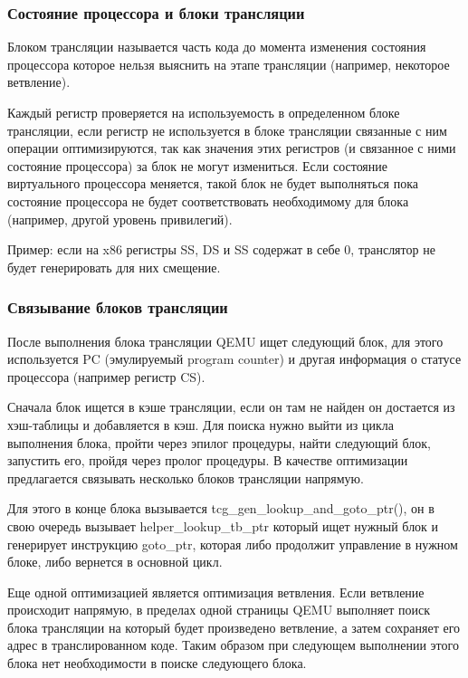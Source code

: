 \subsubsection{Состояние процессора и блоки трансляции}

Блоком трансляции называется часть кода до момента изменения состояния процессора которое нельзя выяснить на этапе трансляции (например, некоторое ветвление).

Каждый регистр проверяется на используемость в определенном блоке трансляции, если регистр не используется в блоке трансляции связанные с ним операции оптимизируются, так как значения этих регистров (и связанное с ними состояние процессора) за блок не могут измениться. Если состояние виртуального процессора меняется, такой блок не будет выполняться пока состояние процессора не будет соответствовать необходимому для блока (например, другой уровень привилегий).

Пример: если на x86 регистры SS, DS и SS содержат в себе 0, транслятор не будет генерировать для них смещение.

\subsubsection{Связывание блоков трансляции}

После выполнения блока трансляции QEMU ищет следующий блок, для этого используется PC (эмулируемый program counter) и другая информация о статусе процессора (например регистр CS).

Сначала блок ищется в кэше трансляции, если он там не найден он достается из хэш-таблицы и добавляется в кэш. Для поиска нужно выйти из цикла выполнения блока, пройти через эпилог процедуры, найти следующий блок, запустить его, пройдя через пролог процедуры. В качестве оптимизации предлагается связывать несколько блоков трансляции напрямую.

Для этого в конце блока вызывается tcg\_gen\_lookup\_and\_goto\_ptr(), он в свою очередь вызывает helper\_lookup\_tb\_ptr который ищет нужный блок и генерирует инструкцию goto\_ptr, которая либо продолжит управление в нужном блоке, либо вернется в основной цикл.

Еще одной оптимизацией является оптимизация ветвления. Если ветвление происходит напрямую, в пределах одной страницы QEMU выполняет поиск блока трансляции на который будет произведено ветвление, а затем сохраняет его адрес в транслированном коде. Таким образом при следующем выполнении этого блока нет необходимости в поиске следующего блока.

